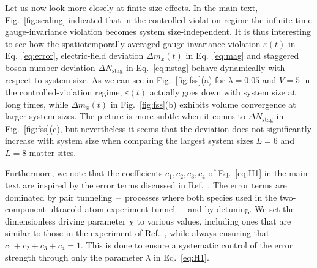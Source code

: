 \documentclass[aps,prl,reprint,twocolumn,superscriptaddress,floatfix,nofootinbib]{revtex4-1}
\begin{document}
Let us now look more closely at finite-size effects. In the main text, Fig.~\ref{fig:scaling} indicated that in the controlled-violation regime the infinite-time gauge-invariance violation becomes system size-independent. It is thus interesting to see how the spatiotemporally averaged gauge-invariance violation $\varepsilon(t)$ in Eq.~\eqref{eq:error}, electric-field deviation $\Delta m_x(t)$ in Eq.~\eqref{eq:mag} and staggered boson-number deviation $\Delta N_\text{stag}$ in Eq.~\eqref{eq:nstag} behave dynamically with respect to system size. As we can see in Fig.~\ref{fig:fss}(a) for $\lambda=0.05$ and $V=5$ in the controlled-violation regime, $\varepsilon(t)$ actually goes down with system size at long times, while $\Delta m_x(t)$ in Fig.~\ref{fig:fss}(b) exhibits volume convergence at larger system sizes. The picture is more subtle when it comes to $\Delta N_\text{stag}$ in Fig.~\ref{fig:fss}(c), but nevertheless it seems that the deviation does not significantly increase with system size when comparing the largest system sizes $L=6$ and $L=8$ matter sites. 

Furthermore, we note that the coefficients $c_1,c_2,c_3,c_4$ of Eq.~\eqref{eq:H1} in the main text are inspired by the error terms discussed in Ref.~\cite{Schweizer2019-S}. The error terms are dominated by pair tunneling~--~processes where both species used in the two-component ultracold-atom experiment tunnel~--~and by detuning. We set the dimensionless driving parameter $\chi$ to various values, including ones that are similar to those in the experiment of Ref.~\cite{Schweizer2019-S}, while always ensuring that $c_1+c_2+c_3+c_4=1$. This is done to ensure a systematic control of the error strength through only the parameter $\lambda$ in Eq.~\eqref{eq:H1}.
\end{document}
